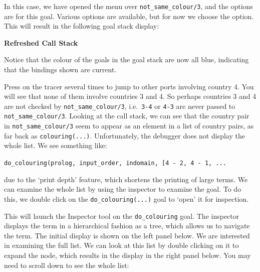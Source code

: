 In this case, we have opened the menu over \verb'not_same_colour/3', and the
options are for this goal. Various options are available, but for now we
choose the  option. This will result in the
following goal stack display:

\begin{center}

{\bf Refreshed Call Stack}
\end{center}

Notice that the colour of the goals in the goal stack are now all blue,
indicating that the bindings shown are current. 

Press  on the tracer several times to jump to other ports
involving country 4. You will see that none of them involve countries 3 and
4. So perhaps countries 3 and 4 are not checked by
\verb'not_same_colour/3', i.e.\ \verb'3-4' or \verb'4-3' are never passed
to \verb'not_same_colour/3'. Looking at the call stack, we can see that the
country pair in \verb'not_same_colour/3' seem to appear as an element in a
list of country pairs, as far back as \verb'colouring(...)'. Unfortunately,
the debugger does not display the whole list. We see something like:

\begin{center}
\verb'do_colouring(prolog, input_order, indomain, [4 - 2, 4 - 1, ... '
\end{center} 
\noindent
due to the `print depth' feature, which shortens the printing of large
terms. We can examine the whole list by using the inspector to examine the
goal. To do this, we double click on the \verb'do_colouring(...)' goal
to `open' it for inspection.

This will launch the Inspector tool on the \verb'do_colouring' goal. The
inspector displays the term in a hierarchical fashion as a tree, which
allows us to navigate the term. The initial display is shown on the left
panel below. We are interested in examining the full list. We can look at
this list by double clicking on it to expand the node, which results in the
display in the right panel below. You may need to scroll
down to see the whole list:

